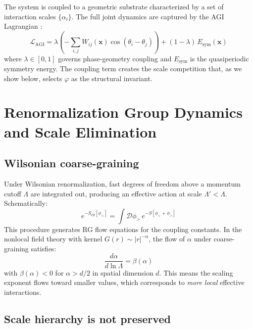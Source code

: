 \documentclass[11pt,a4paper]{article}
\theoremstyle{plain}
\theoremstyle{definition}
\newcommand{\phiGolden}{\varphi}
\newcommand{\Lag}{\mathcal{L}}
\begin{document}
The system is coupled to a geometric substrate characterized by a set of
interaction scales $\{\alpha_i\}$. The full joint dynamics are captured
by the AGI Lagrangian \citep{solis2026cqft}:
\begin{equation}
\label{eq:lagrangian}
\Lag_{\text{AGI}} = \lambda\!\left(
  -\sum_{i,j} W_{ij}(\mathbf{x})\cos(\theta_i - \theta_j)
\right) + (1-\lambda)\,E_{\text{sym}}(\mathbf{x})
\end{equation}
where $\lambda \in [0,1]$ governs phase-geometry coupling and
$E_{\text{sym}}$ is the quasiperiodic symmetry energy. The coupling
term creates the scale competition that, as we show below, selects
$\phiGolden$ as the structural invariant.

\section{Renormalization Group Dynamics and Scale Elimination}
\label{sec:rg}

\subsection{Wilsonian coarse-graining}

Under Wilsonian renormalization, fast degrees of freedom above a momentum
cutoff $\Lambda$ are integrated out, producing an effective action at
scale $\Lambda' < \Lambda$. Schematically:
\begin{equation}
e^{-S_{\text{eff}}[\phi_{<}]} = \int \mathcal{D}\phi_{>}\,
e^{-S[\phi_{<} + \phi_{>}]}
\end{equation}
This procedure generates RG flow equations for the coupling constants.
In the nonlocal field theory with kernel $G(r) \sim |r|^{-\alpha}$,
the flow of $\alpha$ under coarse-graining satisfies:
\begin{equation}
\frac{d\alpha}{d\ln\Lambda} = \beta(\alpha)
\end{equation}
with $\beta(\alpha) < 0$ for $\alpha > d/2$ in spatial dimension $d$.
This means the scaling exponent flows toward smaller values, which
corresponds to \emph{more local} effective interactions.

\subsection{Scale hierarchy is not preserved}
\end{document}
